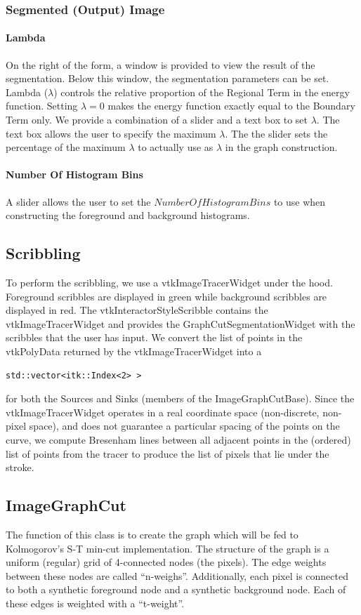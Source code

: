 \documentclass{InsightArticle}
\begin{document}
\subsubsection{Segmented (Output) Image}
\paragraph{Lambda}
On the right of the form, a window is provided to view the result of the segmentation. Below this window, the segmentation parameters can be set. Lambda ($\lambda$) controls the relative proportion of the Regional Term in the energy function. Setting $\lambda = 0$ makes the energy function exactly equal to the Boundary Term only. We provide a combination of a slider and a text box to set $\lambda$. The text box allows the user to specify the maximum $\lambda$. The the slider sets the percentage of the maximum $\lambda$ to actually use as $\lambda$ in the graph construction.

\paragraph{Number Of Histogram Bins}
A slider allows the user to set the $NumberOfHistogramBins$ to use when constructing the foreground and background histograms.

\subsection{Scribbling}
To perform the scribbling, we use a vtkImageTracerWidget under the hood. Foreground scribbles are displayed in green while background scribbles are displayed in red. The vtkInteractorStyleScribble contains the vtkImageTracerWidget and provides the GraphCutSegmentationWidget with the scribbles that the user has input. We convert the list of points in the vtkPolyData returned by the vtkImageTracerWidget into a
\begin{verbatim}
std::vector<itk::Index<2> > 
\end{verbatim}

for both the Sources and Sinks (members of the ImageGraphCutBase). Since the vtkImageTracerWidget operates in a real coordinate space (non-discrete, non-pixel space), and does not guarantee a particular spacing of the points on the curve, we compute Bresenham lines between all adjacent points in the (ordered) list of points from the tracer to produce the list of pixels that lie under the stroke.

\subsection{ImageGraphCut}
The function of this class is to create the graph which will be fed to Kolmogorov's S-T min-cut implementation. The structure of the graph is a uniform (regular) grid of 4-connected nodes (the pixels). The edge weights between these nodes are called ``n-weighs''.  Additionally, each pixel is connected to both a synthetic foreground node and a synthetic background node. Each of these edges is weighted with a ``t-weight''.
\end{document}
